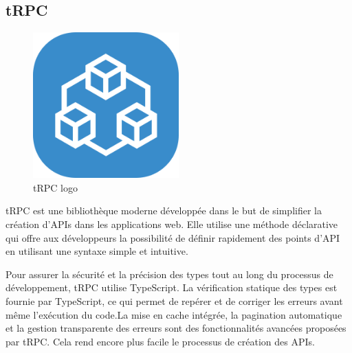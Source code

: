 \documentclass[a4paper,12pt]{report}
\numberwithin{equation}{section}
\begin{document}
\subsection{tRPC}
\begin{figure}[H]
    \centering
    \includegraphics[width=0.5\textwidth]{tech/tRPC.png}
    \caption{tRPC logo}
    \label{fig:tRPC logo}
\end{figure}
\par
tRPC est une bibliothèque moderne développée dans le but de simplifier la création d'APIs dans les applications web. Elle utilise une méthode déclarative qui offre aux développeurs la possibilité de définir rapidement des points d'API en utilisant une syntaxe simple et intuitive. 
\\ \par
Pour assurer la sécurité et la précision des types tout au long du processus de développement, tRPC utilise TypeScript. La vérification statique des types est fournie par TypeScript, ce qui permet de repérer et de corriger les erreurs avant même l'exécution du code.La mise en cache intégrée, la pagination automatique et la gestion transparente des erreurs sont des fonctionnalités avancées proposées par tRPC. Cela rend encore plus facile le processus de création des APIs. 
\newpage
\end{document}
